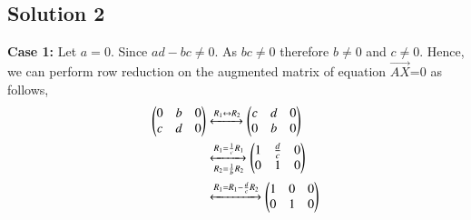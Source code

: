 \documentclass[journal,12pt,twocolumn]{IEEEtran}
\begin{document}
\subsection{Solution 2}
\textbf{Case 1: }Let $a=0$. Since $ad-bc\not=0$. As $bc\not=0$ therefore $b\not=0$ and $c\not=0$. Hence, we can perform row reduction on the augmented matrix of equation $\vec{AX}$=0 as follows,
\begin{align}
\begin{pmatrix}0&b&0\\c&d&0\end{pmatrix}&\xleftrightarrow{R_1\leftrightarrow R_2}\begin{pmatrix}c&d&0\\0&b&0\end{pmatrix}\\
&\xleftrightarrow[R_2 =\frac{1}{b}R_2]{R_1 =\frac{1}{c}R_1}\begin{pmatrix}1&\frac{d}{c}&0\\0&1&0\end{pmatrix}\\
&\xleftrightarrow{R_1=R_1 - \frac{d}{c}R_2}\begin{pmatrix}1&0&0\\0&1&0\end{pmatrix}\label{eqI1}
\end{align}
\begin{comment}

\textbf{Case 2: }Let $a\not=0$. Hence, we can perform row reduction on the augmented matrix of equation $\vec{AX}$=0 as follows,
\begin{align}
\myvec{a&b&0\\c&d&0}&\xleftrightarrow{R_1 = \frac{1}{a}R_1}\myvec{1&\frac{b}{a}&0\\c&d&0}\\
&\xleftrightarrow{R_2 = R_2-cR_1}\myvec{1&\frac{b}{a}&0\\0&\frac{ad-bc}{a}&0}\\
&\xleftrightarrow{R_2=\frac{a}{ad-bc}R_2}\myvec{1&\frac{b}{a}&0\\0&1&0}\\
&\xleftrightarrow{R_1 = R_1-\frac{b}{a}R_2}\myvec{1&0&0\\0&1&0}\label{eqI2}
\end{align}
\textbf{Case 3: }Let $a,b,c,d \not= 0$. Hence, we can perform row reduction on the augmented matrix of equation $\vec{AX}$=0 as follows,
\begin{align}
\myvec{a&b&0\\c&d&0}&\xleftrightarrow{R_1 = \frac{1}{a}R_1}\myvec{1&\frac{b}{a}&0\\c&d&0}\\
&\xleftrightarrow{R_2 = R_2-cR_1}\myvec{1&\frac{b}{a}&0\\0&\frac{ad-bc}{a}&0}\\
&\xleftrightarrow{R_2=\frac{a}{ad-bc}R_2}\myvec{1&\frac{b}{a}&0\\0&1&0}\\
&\xleftrightarrow{R_1 = R_1-\frac{b}{a}R_2}\myvec{1&0&0\\0&1&0}\label{eqI3}
\end{align}

\end{comment}
\end{document}
